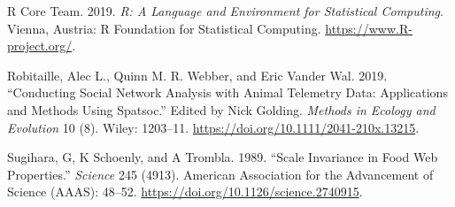\documentclass[]{article}
\begin{document}
\leavevmode\hypertarget{ref-R_Core_Team_2019}{}%
R Core Team. 2019. \emph{R: A Language and Environment for Statistical Computing}. Vienna, Austria: R Foundation for Statistical Computing. \url{https://www.R-project.org/}.

\leavevmode\hypertarget{ref-Robitaille_2019}{}%
Robitaille, Alec L., Quinn M. R. Webber, and Eric Vander Wal. 2019. ``Conducting Social Network Analysis with Animal Telemetry Data: Applications and Methods Using Spatsoc.'' Edited by Nick Golding. \emph{Methods in Ecology and Evolution} 10 (8). Wiley: 1203--11. \url{https://doi.org/10.1111/2041-210x.13215}.

\leavevmode\hypertarget{ref-Sugihara_1989}{}%
Sugihara, G, K Schoenly, and A Trombla. 1989. ``Scale Invariance in Food Web Properties.'' \emph{Science} 245 (4913). American Association for the Advancement of Science (AAAS): 48--52. \url{https://doi.org/10.1126/science.2740915}.
\end{document}
